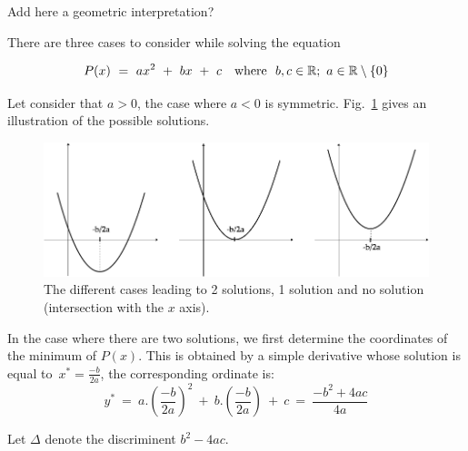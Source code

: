 \bigskip

{\Denis Add here a geometric interpretation?}

There are three cases to consider while solving the equation

\begin{equation}
\label{eq:generic-quadratic-geo}
P(x) \ = \  ax^2 \ + \ bx \ + \ c \ \ \mbox{  where  } \ b,c \in \mathbb{R};
\ a \in \mathbb{R} \setminus \{0\}
\end{equation}

Let consider that $a>0$, the case where $a<0$ is symmetric.
Fig.~\ref{fig:SecondDegreeInit} gives an illustration of the possible solutions.
\begin{figure}[htb]
\begin{center}
       \includegraphics[scale=0.4]{FiguresArithmetic/SecondDegreeInit}
\caption{The different cases leading to 2 solutions, 1 solution and no solution (intersection with the $x$ axis).}
\label{fig:SecondDegreeInit}
\end{center}
\end{figure}

In the case where there are two solutions, we first determine the coordinates of the minimum of $P(x)$.
This is obtained by a simple derivative whose solution is equal to~$x^*=\frac{-b}{2a}$,
the corresponding ordinate is:
\[
y^* \ = \ a.(\frac{-b}{2a})^2 \ + \ b.(\frac{-b}{2a}) \ + \ c \ = \ \frac{-b^2+ 4ac}{4a}
\]

Let $\Delta$ denote the discriminent $b^2 - 4ac$.

